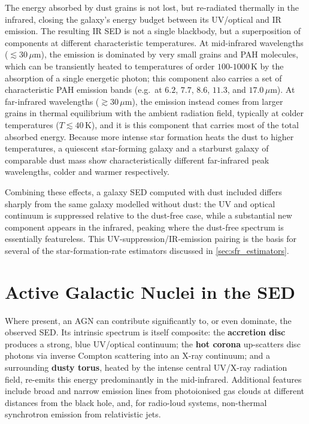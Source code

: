 The energy absorbed by dust grains is not lost, but re-radiated thermally in the infrared, closing the galaxy's energy budget between its UV/optical and IR emission. The resulting IR SED is not a single blackbody, but a superposition of components at different characteristic temperatures. At mid-infrared wavelengths ($\lesssim 30\,\mu\text{m}$), the emission is dominated by very small grains and PAH molecules, which can be transiently heated to temperatures of order $100$-$1000\,\text{K}$ by the absorption of a single energetic photon; this component also carries a set of characteristic PAH emission bands (e.g.\ at $6.2$, $7.7$, $8.6$, $11.3$, and $17.0\,\mu\text{m}$). At far-infrared wavelengths ($\gtrsim 30\,\mu\text{m}$), the emission instead comes from larger grains in thermal equilibrium with the ambient radiation field, typically at colder temperatures ($T \lesssim 40\,\text{K}$), and it is this component that carries most of the total absorbed energy. Because more intense star formation heats the dust to higher temperatures, a quiescent star-forming galaxy and a starburst galaxy of comparable dust mass show characteristically different far-infrared peak wavelengths, colder and warmer respectively.

\medskip

Combining these effects, a galaxy SED computed with dust included differs sharply from the same galaxy modelled without dust: the UV and optical continuum is suppressed relative to the dust-free case, while a substantial new component appears in the infrared, peaking where the dust-free spectrum is essentially featureless. This UV-suppression/IR-emission pairing is the basis for several of the star-formation-rate estimators discussed in \cref{sec:sfr_estimators}.

\section{Active Galactic Nuclei in the SED} \label{sec:agn_seds}

Where present, an AGN can contribute significantly to, or even dominate, the observed SED. Its intrinsic spectrum is itself composite: the \textbf{accretion disc} produces a strong, blue UV/optical continuum; the \textbf{hot corona} up-scatters disc photons via inverse Compton scattering into an X-ray continuum; and a surrounding \textbf{dusty torus}, heated by the intense central UV/X-ray radiation field, re-emits this energy predominantly in the mid-infrared. Additional features include broad and narrow emission lines from photoionised gas clouds at different distances from the black hole, and, for radio-loud systems, non-thermal synchrotron emission from relativistic jets.

